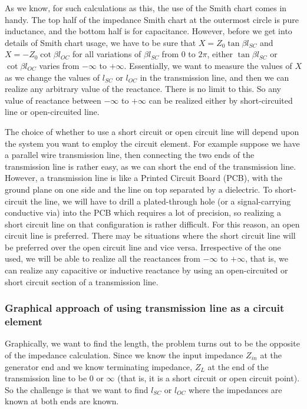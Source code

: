 As we know, for such calculations as this, the use of the Smith chart comes in handy. The top half of the impedance Smith chart at the outermost circle is pure inductance, and the bottom half is for capacitance. However, before we get into details of Smith chart usage, we have to be sure that $X = Z_0\tan\beta l_{SC}$ and $X = -Z_0\cot\beta l_{OC}$ for all variations of $\beta l_{SC}$ from 0 to $ 2\pi $, either $\tan\beta l_{SC}$ or $\cot\beta l_{OC}$ varies from $-\infty$ to $+\infty$. Essentially, we want to measure the values of $X$ as we change the values of $l_{SC}$ or $l_{OC}$ in the transmission line, and then we can realize any arbitrary value of the reactance. There is no limit to this. So any value of reactance between $-\infty$ to $+\infty$ can be realized either by short-circuited line or open-circuited line.

The choice of whether to use a short circuit or open circuit line will depend upon the system you want to employ the circuit element. For example suppose we have a parallel wire transmission line, then connecting the two ends of the transmission line is rather easy, as we can short the end of the transmission line. However, a transmission line is like a Printed Circuit Board (PCB), with the ground plane on one side and the line on top separated by a dielectric. To short-circuit the line, we will have to drill a plated-through hole (or a signal-carrying conductive via) into the PCB which requires a lot of precision, so realizing a short circuit line on that configuration is rather difficult. For this reason, an open circuit line is preferred. There may be situations where the short circuit line will be preferred over the open circuit line and vice versa. Irrespective of the one used, we will be able to realize all the reactances from $ -\infty$ to $+\infty $, that is, we can realize any capacitive or inductive reactance by using an open-circuited or short circuit section of a transmission line.

\subsubsection{Graphical approach of using transmission line as a circuit element}
Graphically, we want to find the length, the problem turns out to be the opposite of the impedance calculation. Since we know the input impedance $Z_{in}$ at the generator end and we know terminating impedance, $Z_{L}$ at the end of the transmission line to be 0 or $\infty$ (that is, it is a short circuit or open circuit point). So the challenge is that we want to find $ l_{SC} $ or $ l_{OC} $ where the impedances are known at both ends are known.

